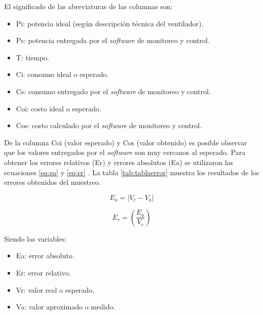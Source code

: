 \vspace{0.1cm}
El significado de las abreviaturas de las columnas son:
\begin{itemize}
\item Pi: potencia ideal (según descripción técnica del ventilador).
\item Ps: potencia entregada por el \emph{software} de monitoreo y control.
\item T: tiempo.
\item Ci: consumo ideal o esperado.
\item Cs: consumo entregado por el \emph{software} de monitoreo y control.
\item Coi: costo ideal o esperado.
\item Cos: costo calculado por el \emph{software} de monitoreo y control.
\end{itemize}

\vspace{0.1cm}
De la columna Coi (valor esperado) y Cos (valor obtenido) es posible observar que los valores entregados por el \emph{software} son muy cercanos al esperado. Para obtener los errores relativos (Er) y errores absolutos (Ea) se utilizaron las ecuaciones  \ref{eq:ea} y \ref{eq:er} . La tabla \ref{tab:tablaerror} muestra los resultados de los errores obtenidos del muestreo.



\begin{equation}
	\label{eq:ea}
	E_a = \left| V_r - V_a \right|
\end{equation}

\begin{equation}
	\label{eq:er}
	E_r = \left( \frac{E_a}{V_r} \right)
\end{equation}

\vspace{1.0cm}
Siendo las variables:
\begin{itemize}
\item Ea: error absoluto. 
\item Er: error relativo.
\item Vr: valor real o esperado.
\item Va: valor aproximado o medido.
\end{itemize}

